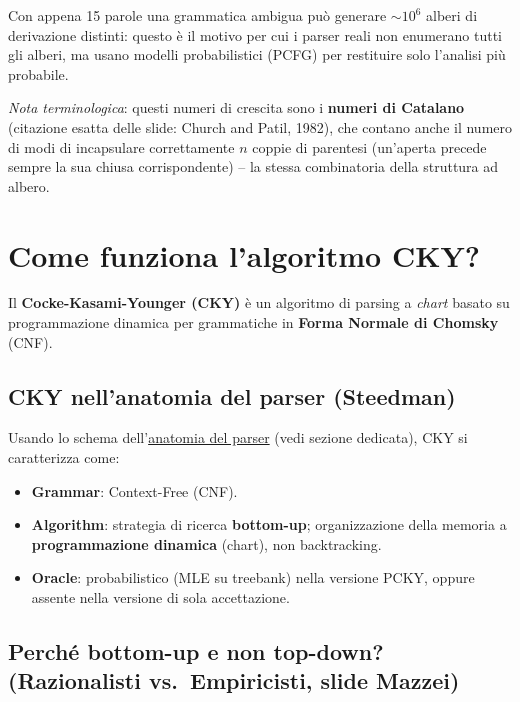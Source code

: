 \documentclass[12pt,a4paper]{article}
\begin{document}
Con appena 15 parole una grammatica ambigua può generare $\sim 10^6$ alberi di derivazione distinti: questo è il motivo per cui i parser reali non enumerano tutti gli alberi, ma usano modelli probabilistici (PCFG) per restituire solo l'analisi più probabile.

\textit{Nota terminologica}: questi numeri di crescita sono i \textbf{numeri di Catalano} (citazione esatta delle slide: Church and Patil, 1982), che contano anche il numero di modi di incapsulare correttamente $n$ coppie di parentesi (un'aperta precede sempre la sua chiusa corrispondente) -- la stessa combinatoria della struttura ad albero.

\section{Come funziona l'algoritmo CKY?}

Il \textbf{Cocke-Kasami-Younger (CKY)} è un algoritmo di parsing a \emph{chart} basato su programmazione dinamica per grammatiche in \textbf{Forma Normale di Chomsky} (CNF).

\subsection{CKY nell'anatomia del parser (Steedman)}

Usando lo schema dell'\hyperref[sec:anatomy]{anatomia del parser} (vedi sezione dedicata), CKY si caratterizza come:
\begin{itemize}[leftmargin=1.5em]
  \item \textbf{Grammar}: Context-Free (CNF).
  \item \textbf{Algorithm}: strategia di ricerca \textbf{bottom-up}; organizzazione della memoria a \textbf{programmazione dinamica} (chart), non backtracking.
  \item \textbf{Oracle}: probabilistico (MLE su treebank) nella versione PCKY, oppure assente nella versione di sola accettazione.
\end{itemize}

\subsection{Perché bottom-up e non top-down? (Razionalisti vs.\ Empiricisti, slide Mazzei)}
\end{document}
